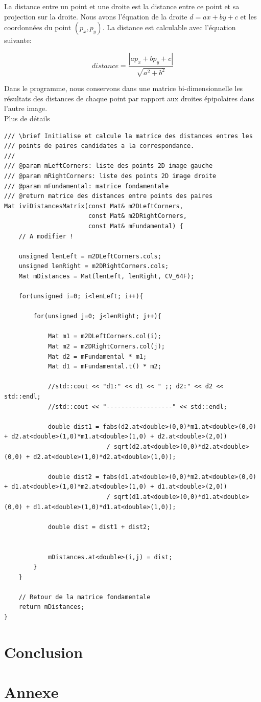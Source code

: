 \documentclass[a4paper,11pt]{article}
\begin{document}
La distance entre un point et une droite est la distance entre ce point et sa projection sur la 
droite. Nous avons l'équation de la droite $d=ax+by+c$ et les coordonnées du point $(p_x,p_y)$.
La distance est calculable avec l'équation suivante:

$$
distance = \frac{|ap_x + bp_y + c|}{\sqrt{a^2+b^2}}
$$

Dans le programme, nous conservons dans une matrice bi-dimensionnelle les résultats des distances 
de chaque point par rapport aux droites épipolaires dans l'autre image.\\

Plus de détails

\begin{lstlisting}[caption=Fontion de calcul des distances]
/// \brief Initialise et calcule la matrice des distances entres les
/// points de paires candidates a la correspondance.
///
/// @param mLeftCorners: liste des points 2D image gauche
/// @param mRightCorners: liste des points 2D image droite
/// @param mFundamental: matrice fondamentale
/// @return matrice des distances entre points des paires
Mat iviDistancesMatrix(const Mat& m2DLeftCorners,
                       const Mat& m2DRightCorners,
                       const Mat& mFundamental) {
    // A modifier !

    unsigned lenLeft = m2DLeftCorners.cols;
    unsigned lenRight = m2DRightCorners.cols;
    Mat mDistances = Mat(lenLeft, lenRight, CV_64F);

    for(unsigned i=0; i<lenLeft; i++){

        for(unsigned j=0; j<lenRight; j++){

            Mat m1 = m2DLeftCorners.col(i);
            Mat m2 = m2DRightCorners.col(j);
            Mat d2 = mFundamental * m1;
            Mat d1 = mFundamental.t() * m2;

            //std::cout << "d1:" << d1 << " ;; d2:" << d2 << std::endl;
            //std::cout << "------------------" << std::endl;

            double dist1 = fabs(d2.at<double>(0,0)*m1.at<double>(0,0) + d2.at<double>(1,0)*m1.at<double>(1,0) + d2.at<double>(2,0))
                            / sqrt(d2.at<double>(0,0)*d2.at<double>(0,0) + d2.at<double>(1,0)*d2.at<double>(1,0));

            double dist2 = fabs(d1.at<double>(0,0)*m2.at<double>(0,0) + d1.at<double>(1,0)*m2.at<double>(1,0) + d1.at<double>(2,0))
                            / sqrt(d1.at<double>(0,0)*d1.at<double>(0,0) + d1.at<double>(1,0)*d1.at<double>(1,0));

            double dist = dist1 + dist2;


            mDistances.at<double>(i,j) = dist;
        }
    }

    // Retour de la matrice fondamentale
    return mDistances;
}
\end{lstlisting}



\section{Conclusion}



\section{Annexe}
\end{document}
